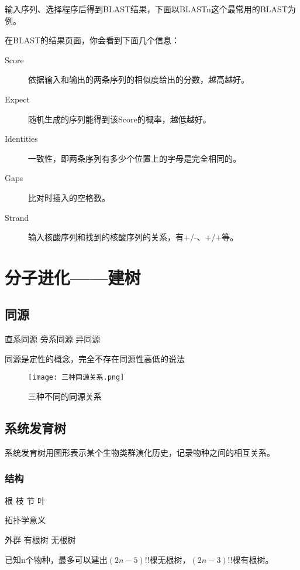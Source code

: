 输入序列、选择程序后得到BLAST结果，下面以BLASTn这个最常用的BLAST为例。

在BLAST的结果页面，你会看到下面几个信息：
\begin{description}
	\item[Score] 依据输入和输出的两条序列的相似度给出的分数，越高越好。
	\item[Expect] 随机生成的序列能得到该Score的概率，越低越好。
	\item[Identities] 一致性，即两条序列有多少个位置上的字母是完全相同的。
	\item[Gaps] 比对时插入的空格数。
	\item[Strand] 输入核酸序列和找到的核酸序列的关系，有+/-、+/+等。
\end{description}




\section{分子进化——建树}

\subsection{同源}

直系同源 旁系同源 异同源

同源是定性的概念，完全不存在同源性高低的说法

\begin{figure}[htbp]
	\centering
	\texttt{[image: 三种同源关系.png]}
	\caption{三种不同的同源关系}
	\label{fig:3homologs}
\end{figure}

\subsection{系统发育树}

系统发育树用图形表示某个生物类群演化历史，记录物种之间的相互关系。

\subsubsection{结构}

根 枝 节 叶

拓扑学意义

外群 有根树 无根树

已知n个物种，最多可以建出$(2n-5)!!$棵无根树，$(2n-3)!!$棵有根树。



